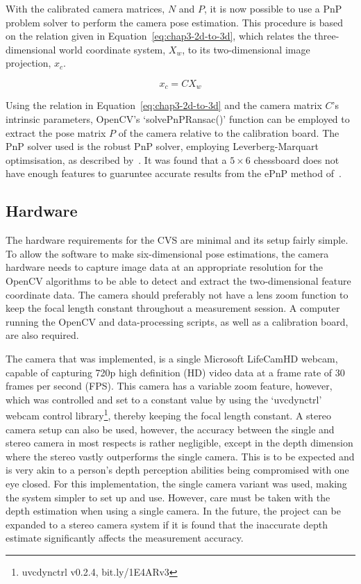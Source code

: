 With the calibrated camera matrices, $N$ and $P$, it is now possible to use a PnP problem solver to perform the camera pose estimation. This procedure is based on the relation given in Equation~\ref{eq:chap3-2d-to-3d}, which relates the three-dimensional world coordinate system, $X_w$, to its two-dimensional image projection, $x_c$.  

\begin{equation}
   \label{eq:chap3-2d-to-3d}
   x_c
   = C
   X_w
\end{equation}

Using the relation in Equation~\ref{eq:chap3-2d-to-3d} and the camera matrix $C$'s intrinsic parameters, OpenCV's `solvePnPRansac()' function can be employed to extract the pose matrix $P$ of the camera relative to the calibration board. The PnP solver used is the robust PnP solver, employing Leverberg-Marquart optimsisation, as described by~\cite{schweighofer2006robust}. It was found that a $5\times6$ chessboard does not have enough features to guaruntee accurate results from the ePnP method of~\cite{lepetit2009epnp}.

\subsection{Hardware}

The hardware requirements for the CVS are minimal and its setup fairly simple. To allow the software to make six-dimensional pose estimations, the camera hardware needs to capture image data at an appropriate resolution for the OpenCV algorithms to be able to detect and extract the two-dimensional feature coordinate data. The camera should preferably not have a lens zoom function to keep the focal length constant throughout a measurement session. A computer running the OpenCV and data-processing scripts, as well as a calibration board, are also required. 

The camera that was implemented, is a single Microsoft LifeCamHD webcam, capable of capturing 720p high definition (HD) video data at a frame rate of 30 frames per second (FPS). This camera has a variable zoom feature, however, which was controlled and set to a constant value by using the `uvcdynctrl' webcam control library\footnote{uvcdynctrl v0.2.4, bit.ly/1E4ARv3}, thereby keeping the focal length constant. A stereo camera setup can also be used, however, the accuracy between the single and stereo camera in most respects is rather negligible, except in the depth dimension where the stereo vastly outperforms the single camera. This is to be expected and is very akin to a person's depth perception abilities being compromised with one eye closed. For this implementation, the single camera variant was used, making the system simpler to set up and use. However, care must be taken with the depth estimation when using a single camera. In the future, the project can be expanded to a stereo camera system if it is found that the inaccurate depth estimate significantly affects the measurement accuracy.


